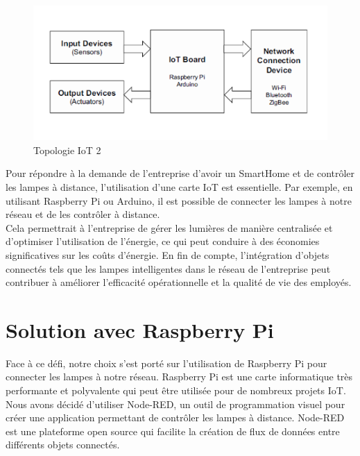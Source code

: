 \begin{figure}[H]
 \centering
    \includegraphics[width=15cm]{Images/IoT-Topo.png}
    \caption{Topologie IoT 2}
    \label{Chap4.2.8}
\end{figure}    
\smallskip

Pour répondre à la demande de l'entreprise d'avoir un SmartHome et de contrôler les lampes à distance, l'utilisation d'une carte IoT est essentielle. Par exemple, en utilisant Raspberry Pi ou Arduino, il est possible de connecter les lampes à notre réseau et de les contrôler à distance. \\

Cela permettrait à l'entreprise de gérer les lumières de manière centralisée et d'optimiser l'utilisation de l'énergie, ce qui peut conduire à des économies significatives sur les coûts d'énergie. En fin de compte, l'intégration d'objets connectés tels que les lampes intelligentes dans le réseau de l'entreprise peut contribuer à améliorer l'efficacité opérationnelle et la qualité de vie des employés. \\




\section{Solution avec Raspberry Pi}

Face à ce défi, notre choix s'est porté sur l'utilisation de Raspberry Pi pour connecter les lampes à notre réseau. Raspberry Pi est une carte informatique très performante et polyvalente qui peut être utilisée pour de nombreux projets IoT. \cite{richardson2012getting} \\

Nous avons décidé d'utiliser Node-RED, un outil de programmation visuel pour créer une application permettant de contrôler les lampes à distance. Node-RED est une plateforme open source qui facilite la création de flux de données entre différents objets connectés. \cite{lekic2018iot} \\

